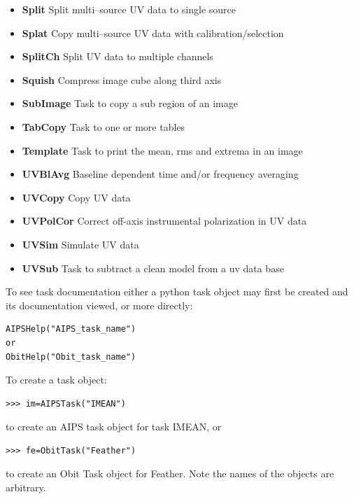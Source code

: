 \documentclass[11pt]{report}
\begin{document}
\begin{itemize}
\item {\bf Split}     Split multi--source UV data to single source
\item {\bf Splat}     Copy multi--source UV data with calibration/selection
\item {\bf SplitCh}   Split UV data to multiple channels
\item {\bf Squish}    Compress image cube along third axis
\item {\bf SubImage}  Task to copy a sub region of an image
\item {\bf TabCopy}   Task to one or more tables
\item {\bf Template}  Task to print the mean, rms and extrema in an image
\item {\bf UVBlAvg}   Baseline dependent time and/or frequency averaging
\item {\bf UVCopy}    Copy UV data
\item {\bf UVPolCor}  Correct off-axis instrumental polarization in UV data
\item {\bf UVSim}     Simulate UV data
\item {\bf UVSub}     Task to subtract a clean model from a uv data base
\end{itemize}


   To see task documentation either a python task object may first
be created and its documentation viewed, or more directly:
\begin{verbatim}
AIPSHelp("AIPS_task_name")
or
ObitHelp("Obit_task_name")
\end{verbatim}

   To create a task object:
\begin{verbatim}
>>> im=AIPSTask("IMEAN")
\end{verbatim}
to create an AIPS task object for task IMEAN, or

\begin{verbatim}
>>> fe=ObitTask("Feather")
\end{verbatim}
to create an Obit Task object for Feather.
Note the names of the objects are arbitrary.
\end{document}
